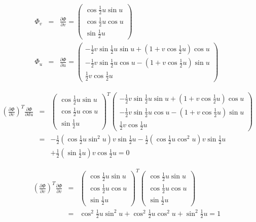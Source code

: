 \begin{eqnarray}
\Phi _{v}&=&\frac{\partial \Phi }{\partial v}=\allowbreak \left(
\begin{array}{c}
\cos \frac{1}{2}u\sin u \\
\cos \frac{1}{2}u\cos u \\
\sin \frac{1}{2}u
\end{array}
\right)
 \\
\Phi _{u}&=&\frac{\partial \Phi }{\partial u}=\allowbreak \left(
\begin{array}{c}
-\frac{1}{2}v\sin \frac{1}{2}u\sin u+\left( 1+v\cos \frac{1}{2}u\right) \cos
u \\
-\frac{1}{2}v\sin \frac{1}{2}u\cos u-\left( 1+v\cos \frac{1}{2}u\right) \sin
u \\
\frac{1}{2}v\cos \frac{1}{2}u
\end{array}
\right)
\end{eqnarray}


\begin{eqnarray}
(\frac{\partial \Phi }{\partial v})^{T}\frac{\partial \Phi }{\partial du}
&=&\allowbreak \left(
\begin{array}{c}
\cos \frac{1}{2}u\sin u \\
\cos \frac{1}{2}u\cos u \\
\sin \frac{1}{2}u
\end{array}
\right) ^{T}\left(
\begin{array}{c}
-\frac{1}{2}v\sin \frac{1}{2}u\sin u+\left( 1+v\cos \frac{1}{2}u\right) \cos
u \\
-\frac{1}{2}v\sin \frac{1}{2}u\cos u-\left( 1+v\cos \frac{1}{2}u\right) \sin
u \\
\frac{1}{2}v\cos \frac{1}{2}u
\end{array}
\right)
\nonumber \\
&=&
-\frac{1}{2}\left( \cos \frac{1}{2}u\sin ^{2}u\right) v\sin \frac{1}{2}u-%
\frac{1}{2}\left( \cos \frac{1}{2}u\cos ^{2}u\right) v\sin \frac{1}{2}u
\nonumber \\
&&
+%
\frac{1}{2}\left( \sin \frac{1}{2}u\right) v\cos \frac{1}{2}u=\allowbreak 0
\end{eqnarray}

\begin{eqnarray}
(\frac{\partial \Phi }{\partial v})^{T}\frac{\partial \Phi }{\partial v}&=&\allowbreak \left(
\begin{array}{c}
\cos \frac{1}{2}u\sin u \\
\cos \frac{1}{2}u\cos u \\
\sin \frac{1}{2}u
\end{array}
\right) ^{T}\left(
\begin{array}{c}
\cos \frac{1}{2}u\sin u \\
\cos \frac{1}{2}u\cos u \\
\sin \frac{1}{2}u
\end{array}
\right)
\nonumber \\
&=&
\cos ^{2}\frac{1}{2}u\sin ^{2}u+\cos ^{2}\frac{1}{2}u\cos ^{2}u+\sin ^{2}%
\frac{1}{2}u=\allowbreak 1
\end{eqnarray}


